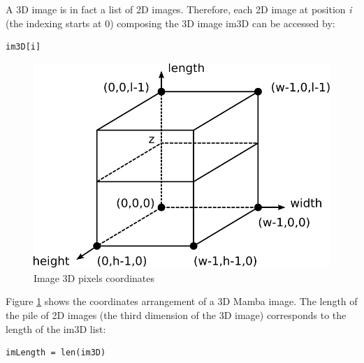 \documentclass[a4paper,10pt,oneside]{article}
\begin{document}
A 3D image is in fact a list of 2D images. Therefore, each 2D image at position \emph{i}
(the indexing starts at 0) composing the 3D image im3D can
be accessed by:

\lstset{language=Python}
\begin{lstlisting}
im3D[i]
\end{lstlisting}

\begin{figure}
\centering
\includegraphics[scale=0.8]{figures/image3D_coord.pdf}
\caption{Image 3D pixels coordinates}
\label{fig:image3D_coord}
\end{figure}

Figure \ref{fig:image3D_coord} shows the coordinates arrangement of a 3D Mamba image. The length of the pile of 2D images (the third
dimension of the 3D image) corresponds to the length of the im3D list:

\lstset{language=Python}
\begin{lstlisting}
imLength = len(im3D)
\end{lstlisting}
\end{document}
